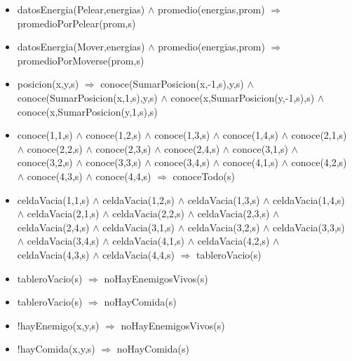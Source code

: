 \begin{itemize}
\item  datosEnergia(Pelear,energias) $\land$ 
 promedio(energias,prom) $\Rightarrow$
 promedioPorPelear(prom,s)

\item  datosEnergia(Mover,energias) $\land$ 
 promedio(energias,prom) $\Rightarrow$
 promedioPorMoverse(prom,s)

\item posicion(x,y,s) $\Rightarrow$
 conoce(SumarPosicion(x,-1,s),y,s) $\land$  
 conoce(SumarPosicion(x,1,s),y,s) $\land$ 
 conoce(x,SumarPosicion(y,-1,s),s) $\land$ 
 conoce(x,SumarPosicion(y,1,s),s) 

\item conoce(1,1,s) $\land$ conoce(1,2,s) $\land$ 
 conoce(1,3,s) $\land$ conoce(1,4,s) $\land$ 
 \newline 
 conoce(2,1,s) $\land$ conoce(2,2,s) $\land$ 
 conoce(2,3,s) $\land$ conoce(2,4,s) $\land$ 
 \newline 
 conoce(3,1,s) $\land$ conoce(3,2,s) $\land$ 
 conoce(3,3,s) $\land$ conoce(3,4,s) $\land$ 
 \newline 
 conoce(4,1,s) $\land$ conoce(4,2,s) $\land$ 
 conoce(4,3,s) $\land$ conoce(4,4,s) 
 \newline
 $\Rightarrow$ conoceTodo(s)

\item celdaVacia(1,1,s) $\land$ celdaVacia(1,2,s) $\land$ 
 celdaVacia(1,3,s) $\land$ celdaVacia(1,4,s) $\land$ 
 \newline 
 celdaVacia(2,1,s) $\land$ celdaVacia(2,2,s) $\land$ 
 celdaVacia(2,3,s) $\land$ celdaVacia(2,4,s) $\land$
 \newline  
 celdaVacia(3,1,s) $\land$ celdaVacia(3,2,s) $\land$ 
 celdaVacia(3,3,s) $\land$ celdaVacia(3,4,s) $\land$ 
 \newline 
 celdaVacia(4,1,s) $\land$ celdaVacia(4,2,s) $\land$ 
 celdaVacia(4,3,s) $\land$ celdaVacia(4,4,s) 
 $\Rightarrow$ tableroVacio(s)
 
\item tableroVacio(s) $\Rightarrow$ noHayEnemigosVivos(s) 
\item tableroVacio(s) $\Rightarrow$ noHayComida(s)

\item !hayEnemigo(x,y,s) $\Rightarrow$ noHayEnemigosVivos(s) 
\item !hayComida(x,y,s) $\Rightarrow$ noHayComida(s)


\end{itemize}
